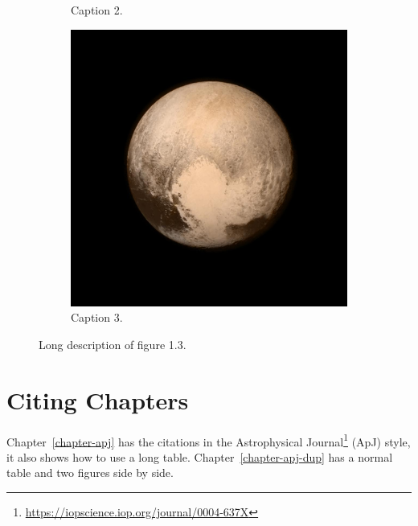 \begin{figure}[htb!]
\begin{subfigure}{0.35\linewidth}
\caption{Caption 2.}\label{fig3-b}
\end{subfigure}
\begin{subfigure}{0.24\linewidth}
\center
\includegraphics[width=\textwidth]{figures/PIA19708-orig.jpg}
\caption{Caption 3.}\label{fig3-c}
\end{subfigure}
\caption[Short description of figure 1.3.]{Long description of figure 1.3.}\label{fig3}
\end{figure}
\section{Citing Chapters}
Chapter~\ref{chapter-apj} has the citations in the Astrophysical Journal\footnote{\url{https://iopscience.iop.org/journal/0004-637X}} (ApJ) style, it also shows how to use a long table. Chapter~\ref{chapter-apj-dup} has a normal table and two figures side by side.
